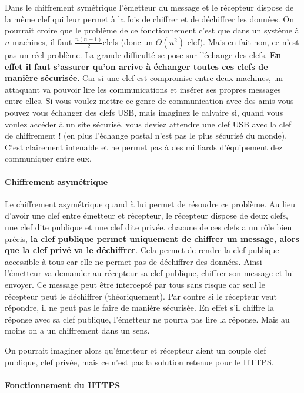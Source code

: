 \documentclass[a4paper]{article}
\begin{document}
Dans le chiffrement symétrique l'émetteur du message et le récepteur
dispose de la même clef qui leur permet à la fois de chiffrer et de
déchiffrer les données. On pourrait croire que le problème de ce
fonctionnement c'est que dans un système à \(n\) machines, il faut
\(\frac{n(n-1)}{2}\)clefs (donc un \(\Theta(n^2)\) clef). Mais en fait
non, ce n'est pas un réel problème. La grande difficulté se pose sur
l'échange des clefs. \textbf{En effet il faut s'assurer qu'on arrive à
échanger toutes ces clefs de manière sécurisée}. Car si une clef est
compromise entre deux machines, un attaquant va pouvoir lire les
communications et insérer ses propres messages entre elles. Si vous
voulez mettre ce genre de communication avec des amis vous pouvez vous
échanger des clefs USB, mais imaginez le calvaire si, quand vous voulez
accéder à un site sécurisé, vous deviez attendre une clef USB avec la
clef de chiffrement ! (en plus l'échange postal n'est pas le plus
sécurisé du monde). C'est clairement intenable et ne permet pas à des
milliards d'équipement dez communiquer entre eux.

\hypertarget{header-n36}{%
\paragraph{Chiffrement asymétrique}\label{header-n36}}

Le chiffrement asymétrique quand à lui permet de résoudre ce problème.
Au lieu d'avoir une clef entre émetteur et récepteur, le récepteur
dispose de deux clefs, une clef dite publique et une clef dite privée.
chacune de ces clefs a un rôle bien précis, \textbf{la clef publique
permet uniquement de chiffrer un message, alors que la clef privé va le
déchiffrer}. Cela permet de rendre la clef publique accessible à tous
car elle ne permet pas de déchiffrer des données. Ainsi l'émetteur va
demander au récepteur sa clef publique, chiffrer son message et lui
envoyer. Ce message peut être intercepté par tous sans risque car seul
le récepteur peut le déchiffrer (théoriquement). Par contre si le
récepteur veut répondre, il ne peut pas le faire de manière sécurisée.
En effet s'il chiffre la réponse avec sa clef publique, l'émetteur ne
pourra pas lire la réponse. Mais au moins on a un chiffrement dans un
sens.

On pourrait imaginer alors qu'émetteur et récepteur aient un couple clef
publique, clef privée, mais ce n'est pas la solution retenue pour le
HTTPS.

\hypertarget{header-n39}{%
\paragraph{Fonctionnement du HTTPS}\label{header-n39}}
\end{document}
